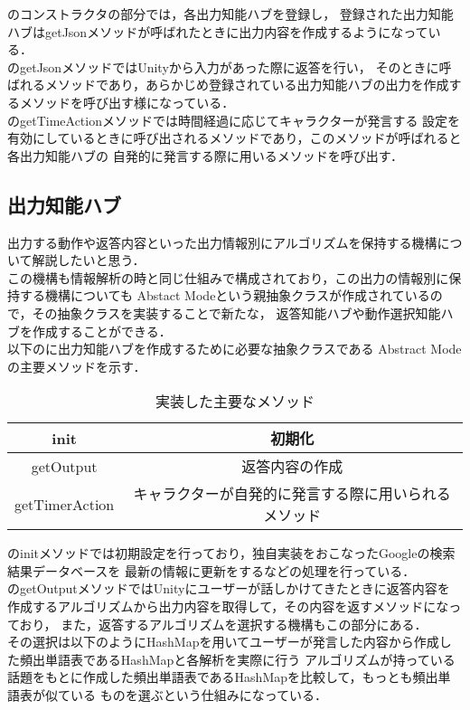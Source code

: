 のコンストラクタの部分では，各出力知能ハブを登録し，
登録された出力知能ハブはgetJsonメソッドが呼ばれたときに出力内容を作成するようになっている．
\\
のgetJsonメソッドではUnityから入力があった際に返答を行い，
そのときに呼ばれるメソッドであり，あらかじめ登録されている出力知能ハブの出力を作成するメソッドを呼び出す様になっている．
\\
のgetTimeActionメソッドでは時間経過に応じてキャラクターが発言する
設定を有効にしているときに呼び出されるメソッドであり，このメソッドが呼ばれると各出力知能ハブの
自発的に発言する際に用いるメソッドを呼び出す．
\\



\subsection{出力知能ハブ}
出力する動作や返答内容といった出力情報別にアルゴリズムを保持する機構について解説したいと思う．
\\
この機構も情報解析の時と同じ仕組みで構成されており，この出力の情報別に保持する機構についても
Abstact Modeという親抽象クラスが作成されているので，その抽象クラスを実装することで新たな，
返答知能ハブや動作選択知能ハブを作成することができる．
\\
以下のに出力知能ハブを作成するために必要な抽象クラスである
Abstract Modeの主要メソッドを示す．\\

\begin{table}[tbh]
	\caption{実装した主要なメソッド} \label{tab:abstractmode}
	\begin{center}
		\begin{tabular}[htb]{c|c}
		\hline
		init & 初期化 \\
		\hline
		getOutput & 返答内容の作成 \\
		\hline
		getTimerAction & キャラクターが自発的に発言する際に用いられるメソッド \\
		\hline
		\end{tabular}
	\end{center}
\end{table}

のinitメソッドでは初期設定を行っており，独自実装をおこなったGoogleの検索結果データベースを
最新の情報に更新をするなどの処理を行っている．
\\
のgetOutputメソッドではUnityにユーザーが話しかけてきたときに返答内容を
作成するアルゴリズムから出力内容を取得して，その内容を返すメソッドになっており，
また，返答するアルゴリズムを選択する機構もこの部分にある．
\\
その選択は以下のようにHashMapを用いてユーザーが発言した内容から作成した頻出単語表であるHashMapと各解析を実際に行う
アルゴリズムが持っている話題をもとに作成した頻出単語表であるHashMapを比較して，もっとも頻出単語表が似ている
ものを選ぶという仕組みになっている．\\

